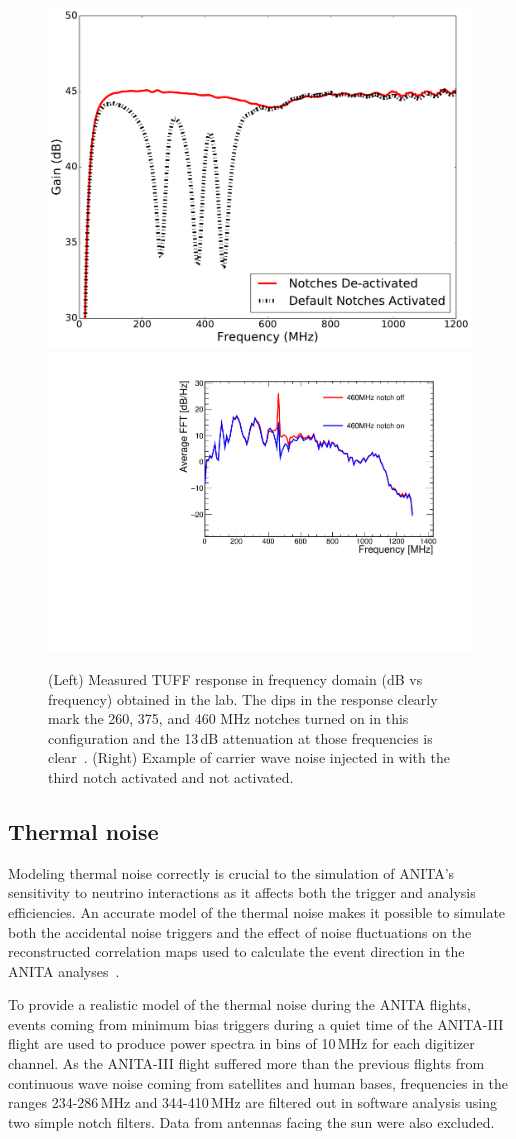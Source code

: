 \begin{figure}
  \centering
 \includegraphics[width=0.4\linewidth] {./Figs/measured_gain_freq_on_off.pdf} 
 \includegraphics[width=0.45\linewidth] {./Figs/Icemc_tuffs.pdf} 
  \caption{(Left) Measured TUFF response in frequency domain (dB vs frequency) obtained in the lab. The dips in the response clearly mark the 260, 375, and 460 MHz notches turned on in this configuration and the 13\,dB attenuation at those frequencies is clear~\cite{Allison:2017vtk}.
  (Right) Example of carrier wave noise injected in \icemc with the third notch activated and not activated.}
\label{fig:TUFFs}
\end{figure}



\subsection{Thermal noise}
\label{subsec:ANITA_thermalNoise}
Modeling thermal noise correctly is crucial to the simulation of ANITA’s
sensitivity to neutrino interactions as it affects both the trigger and analysis efficiencies.
An accurate model of the thermal noise makes it possible to simulate both the
accidental noise triggers and the effect of noise fluctuations on the
reconstructed correlation maps used to calculate the event direction in the ANITA analyses~\cite{romero2015interferometric}.

To provide a realistic model of the thermal noise during the ANITA flights, events coming from minimum bias triggers during
a quiet time of the ANITA-III flight are used to produce power spectra in bins of 10\,MHz for each digitizer channel.
As the ANITA-III flight suffered more than the previous flights 
from continuous wave noise coming
from satellites and human bases, frequencies in the ranges
234-286\,MHz and 344-410\,MHz are filtered out in software analysis
using two simple notch filters. 
Data from antennas facing the sun were also excluded.

